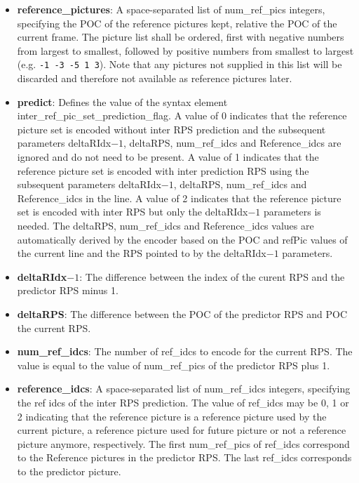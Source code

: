 \documentclass[a3paper,11pt]{jctvcdoc}
\begin{document}
\begin{itemize}
    \item[]\textbf{reference_pictures}: A space-separated list of
          num_ref_pics integers, specifying the POC of the reference pictures
          kept, relative the POC of the current frame. The picture list shall be
          ordered, first with negative numbers from largest to smallest, followed
          by positive numbers from smallest to largest (e.g. \verb|-1 -3 -5 1 3|).
          Note that any pictures not supplied in this list will be discarded and
          therefore not available as reference pictures later.

    \item[]\textbf{predict}: Defines the value of the syntax element
          inter_ref_pic_set_prediction_flag. A value of 0 indicates that the
          reference picture set is encoded without inter RPS prediction and the
          subsequent parameters deltaRIdx$-1$, deltaRPS, num_ref_idcs and
          Reference_idcs are ignored and do not need to be present. A value of 1
          indicates that the reference picture set is encoded with inter
          prediction RPS using the subsequent parameters deltaRIdx$-1$, deltaRPS,
          num_ref_idcs and Reference_idcs in the line. A value of 2 indicates that
          the reference picture set is encoded with inter RPS but only the
          deltaRIdx$-1$ parameters is needed. The deltaRPS, num_ref_idcs and
          Reference_idcs values are automatically derived by the encoder based on
          the POC and refPic values of the current line and the RPS pointed to by
          the deltaRIdx$-1$ parameters.

    \item[]\textbf{deltaRIdx$-1$}: The difference between the index of the
          curent RPS and the predictor RPS minus 1.

    \item[]\textbf{deltaRPS}: The difference between the POC of the
          predictor RPS and POC the current RPS.

    \item[]\textbf{num_ref_idcs}: The number of ref_idcs to encode for the
          current RPS.  The value is equal to the value of  num_ref_pics of the
          predictor RPS plus 1.

    \item[]\textbf{reference_idcs}: A space-separated list of num_ref_idcs
          integers, specifying the ref idcs of the inter RPS prediction. The value
          of ref_idcs may be 0, 1 or 2 indicating that the reference picture is a
          reference picture used by the current picture, a reference picture used
          for future picture or not a reference picture anymore, respectively. The
          first num_ref_pics of ref_idcs correspond to the Reference pictures in
          the predictor RPS. The last ref_idcs corresponds to the predictor
          picture.
\end{itemize}
\end{document}
